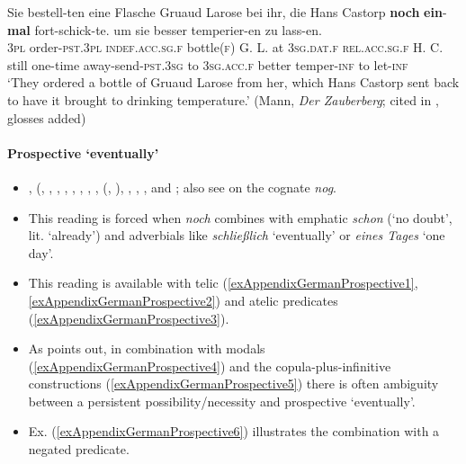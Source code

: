 \begin{exe}
	\ex\label{exAppendixGermanIterativeViaIncrement5}
\gll Sie bestell-ten eine Flasche Gruaud Larose bei ihr, die Hans Castorp \textbf{noch} \textbf{ein}-\textbf{mal} fort-schick-te. um sie besser temperier-en zu lass-en.\\
3\textsc{pl} order-\textsc{pst}.3\textsc{pl} \textsc{indef}.\textsc{acc}.\textsc{sg}.\textsc{f} bottle(\textsc{f}) G. L. at 3\textsc{sg}.\textsc{dat}.\textsc{f} \textsc{rel}.\textsc{acc}.\textsc{sg}.\textsc{f} H. C. still one-time away-send-\textsc{pst}.3\textsc{sg} to 3\textsc{sg}.\textsc{acc}.\textsc{f} better temper-\textsc{inf} to let-\textsc{inf}\\
\glt \lq They ordered a bottle of Gruaud Larose from her, which Hans Castorp sent back to have it brought to drinking temperature.' (Mann, \textit{Der Zauberberg}; cited in \cite[61]{Shetter1966}, glosses added)
\end{exe}

\paragraph{Prospective \lq eventually\rq{}}
\label{appendixGermanProspective}
\begin{itemize}
	\sloppy
	\item \citeauthor{Abraham1977}, (\citeyear{Abraham1977}, \citeyear{Abraham1980}, \textcite{vanderAuwera1993}, \textcite[s.v. \textit{noch}]{DWDS},  \textcite{Doherty1973}, \textcite[s.v. \textit{noch}]{Duden}, \textcite[187]{Helbig1994}, \textcite{HoepelmanRohrer1981}, \citeauthor{Koenig1977} (\citeyear{Koenig1977}, \citeyear[140–143]{Koenig1991}), \textcite[173]{KoenigEtAl1993}, \textcite{Loebner1989}, \textcite[621–622]{MetrichFaucher2009}, \textcite{Shetter1966} and \textcite{Vaelikangas1982}; also see \textcite{Vandeweghe1984} on the  cognate \textit{nog}.	
	\item This reading is forced when \textit{noch} combines with emphatic \textit{schon} (\lq no doubt', lit. \lq already') and adverbials like \textit{schließlich} \lq eventually' or \textit{eines Tages} \lq one day'.
	\item This reading is available with telic (\ref{exAppendixGermanProspective1}, \ref{exAppendixGermanProspective2}) and atelic predicates (\ref{exAppendixGermanProspective3}).
	\item As \textcite{Shetter1966} points out, in combination with modals (\ref{exAppendixGermanProspective4}) and the copula\hyp plus\hyp infinitive constructions (\ref{exAppendixGermanProspective5}) there is often ambiguity between a persistent possibility/necessity and prospective \lq eventually\rq{}.
	\item Ex. (\ref{exAppendixGermanProspective6}) illustrates the combination with a negated predicate.
\end{itemize}

